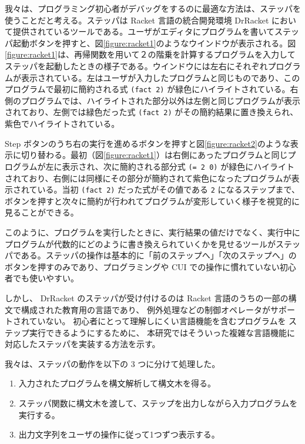 我々は、プログラミング初心者がデバッグをするのに最適な方法は、ステッパを使うことだと考える。ステッパは Racket 言語の統合開発環境 DrRacket において提供されているツール\cite{clements01}である。ユーザがエディタにプログラムを書いてステッパ起動ボタンを押すと、図\ref{figure:racket1}のようなウインドウが表示される。図\ref{figure:racket1}は、再帰関数を用いて２の階乗を計算するプログラムを入力してステッパを起動したときの様子である。ウインドウには左右にそれぞれプログラムが表示されている。左はユーザが入力したプログラムと同じものであり、このプログラムで最初に簡約される式 \texttt{(fact 2)} が緑色にハイライトされている。右側のプログラムでは、ハイライトされた部分以外は左側と同じプログラムが表示されており、左側では緑色だった式 \texttt{(fact 2)} がその簡約結果に置き換えられ、紫色でハイライトされている。

Step ボタンのうち右の実行を進めるボタンを押すと図\ref{figure:racket2}のような表示に切り替わる。最初（図\ref{figure:racket1}）は右側にあったプログラムと同じプログラムが左に表示され、次に簡約される部分式 \texttt{(= 2 0)} が緑色にハイライトされており、右側には同様にその部分が簡約されて紫色になったプログラムが表示されている。当初 \texttt{(fact 2)} だった式がその値である \texttt{2} になるステップまで、ボタンを押すと次々に簡約が行われてプログラムが変形していく様子を視覚的に見ることができる。

このように、プログラムを実行したときに、実行結果の値だけでなく、実行中にプログラムが代数的にどのように書き換えられていくかを見せるツールがステッパである。ステッパの操作は基本的に「前のステップへ」「次のステップへ」のボタンを押すのみであり、プログラミングや CUI での操作に慣れていない初心者でも使いやすい。

しかし、
DrRacket のステッパが受け付けるのは Racket 言語のうちの一部の構文で構成された教育用の言語であり、
例外処理などの制御オペレータがサポートされていない。
初心者にとって理解しにくい言語機能を含むプログラムを
ステップ実行できるようにするために、
本研究ではそういった複雑な言語機能に対応したステッパを実装する方法を示す。

我々は、ステッパの動作を以下の 3 つに分けて処理した。

\begin{enumerate}
\item 入力されたプログラムを構文解析して構文木を得る。
\item ステッパ関数に構文木を渡して、ステップを出力しながら入力プログラムを実行する。
\item 出力文字列をユーザの操作に従って1つずつ表示する。
\end{enumerate}

